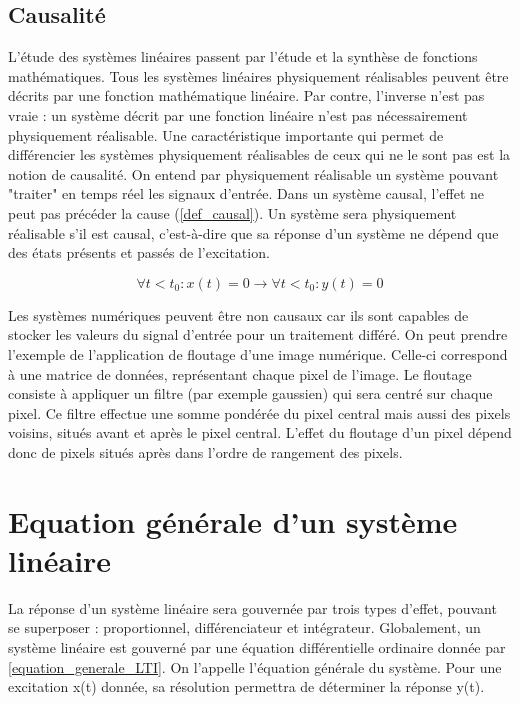 \documentclass[]{report}
\begin{document}
	\subsection{Causalité}
	L'étude des systèmes linéaires passent par l'étude et la synthèse de fonctions mathématiques. Tous les systèmes linéaires physiquement réalisables peuvent être décrits par une fonction mathématique linéaire. Par contre, l'inverse n'est pas vraie : un système décrit par une fonction linéaire n'est pas nécessairement physiquement réalisable. Une caractéristique importante qui permet de différencier les systèmes physiquement réalisables de ceux qui ne le sont pas est la notion de causalité. On entend par physiquement réalisable un système pouvant "traiter" en temps réel les signaux d'entrée.
	Dans un système causal, l'effet ne peut pas précéder la cause (\ref{def_causal}). Un système sera physiquement réalisable s'il est causal, c'est-à-dire que sa réponse d'un système ne dépend que des états présents et passés de l'excitation.
	
	\begin{equation}\label{def_causal}
	\forall t < t_{0} : x(t) = 0 \rightarrow \forall t < t_{0} : y(t) = 0
	\end{equation}
	
	Les systèmes numériques peuvent être non causaux car ils sont capables de stocker les valeurs du signal d'entrée pour un traitement différé. On peut prendre l'exemple de l'application de floutage d'une image numérique. Celle-ci correspond à une matrice de données, représentant chaque pixel de l'image. Le floutage consiste à appliquer un filtre (par exemple gaussien) qui sera centré sur chaque pixel. Ce filtre effectue une somme pondérée du pixel central mais aussi des pixels voisins, situés avant et après le pixel central. L'effet du floutage d'un pixel dépend donc de pixels situés après dans l'ordre de rangement des pixels. 

	
	
	\section{Equation générale d'un système linéaire}
	La réponse d'un système linéaire sera gouvernée par trois types d'effet, pouvant se superposer : proportionnel, différenciateur et intégrateur. Globalement, un système linéaire est gouverné par une équation différentielle ordinaire donnée par \ref{equation_generale_LTI}. On l'appelle l'équation générale du système. Pour une excitation x(t) donnée, sa résolution permettra de déterminer la réponse y(t).
	
\end{document}
